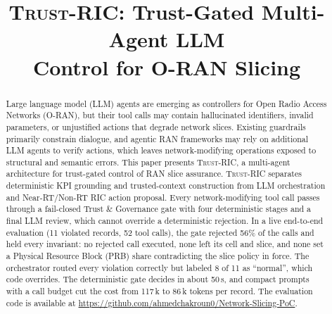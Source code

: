 \documentclass[conference]{IEEEtran}
\newcommand{\fw}{\textsc{Trust-RIC}}
\newcommand{\repo}{\url{https://github.com/ahmedchakroun0/Network-Slicing-PoC}}
\begin{document}
\title{\fw{}: Trust-Gated Multi-Agent LLM\\ Control for O-RAN Slicing}

\author{
}

\maketitle
\begin{abstract}
Large language model (LLM) agents are emerging as controllers for Open Radio Access Networks (O-RAN), but their tool calls may contain hallucinated identifiers, invalid parameters, or unjustified actions that degrade network slices. Existing guardrails primarily constrain dialogue, and agentic RAN frameworks may rely on additional LLM agents to verify actions, which leaves network-modifying operations exposed to structural and semantic errors. This paper presents \fw{}, a multi-agent architecture for trust-gated control of RAN slice assurance. \fw{} separates deterministic KPI grounding and trusted-context construction from LLM orchestration and Near-RT/Non-RT RIC action proposal. Every network-modifying tool call passes through a fail-closed Trust \& Governance gate with four deterministic stages and a final LLM review, which cannot override a deterministic rejection. In a live end-to-end evaluation (11 violated records, 52 tool calls), the gate rejected 56\% of the calls and held every invariant: no rejected call executed, none left its cell and slice, and none set a Physical Resource Block (PRB) share contradicting the slice policy in force. The orchestrator routed every violation correctly but labeled 8 of 11 as ``normal'', which code overrides. The deterministic gate decides in about 50\,\textmu s, and compact prompts with a call budget cut the cost from 117\,k to 86\,k tokens per record. The evaluation code is available at \repo.
\end{abstract}
\end{document}
